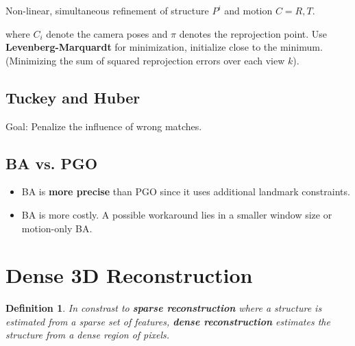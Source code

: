 \documentclass[10pt,a4paper]{scrartcl}
\newtheorem{define}{Definition}
\begin{document}
\begin{multicols*}{2}
Non-linear, simultaneous refinement of structure $P^i$ and motion $C=R,T$.


where $C_i$ denote the camera poses and $\pi$ denotes the reprojection point. Use \textbf{Levenberg-Marquardt} for minimization, initialize close to the minimum. (Minimizing the sum of squared reprojection errors over each view $k$).


\subsection{Tuckey and Huber}

Goal: Penalize the influence of wrong matches.




\subsection{BA vs. PGO}

\begin{itemize}
\item BA is \textbf{more precise} than PGO since it uses additional landmark constraints.
\item BA is more costly. A possible workaround lies in a smaller window size or motion-only BA.
\end{itemize}

\section{Dense 3D Reconstruction}

\begin{define}
In constrast to \textbf{sparse reconstruction} where a structure is estimated from a sparse set of features, \textbf{dense reconstruction} estimates the structure from a dense region of pixels.
\end{define}


\end{multicols*}
\end{document}
